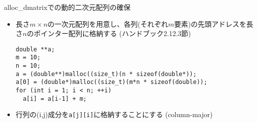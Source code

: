 \begin{frame}[t,fragile]{alloc\_dmatrixでの動的二次元配列の確保}
  \begin{itemize}
  \item 長さ$m \times n$の一次元配列を用意し、各列(それぞれ$m$要素)の先頭アドレスを長さ$n$のポインター配列に格納する (ハンドブック2.12.3節)
\begin{lstlisting}
double **a;
m = 10;  
n = 10;  
a = (double**)malloc((size_t)(n * sizeof(double*));
a[0] = (double*)malloc((size_t)(m*n * sizeof(double));
for (int i = 1; i < n; ++i)
  a[i] = a[i-1] + m;
\end{lstlisting}
\item 行列の(i,j)成分を\verb+a[j][i]+に格納することにする (column-major)
  \end{itemize}
\end{frame}
